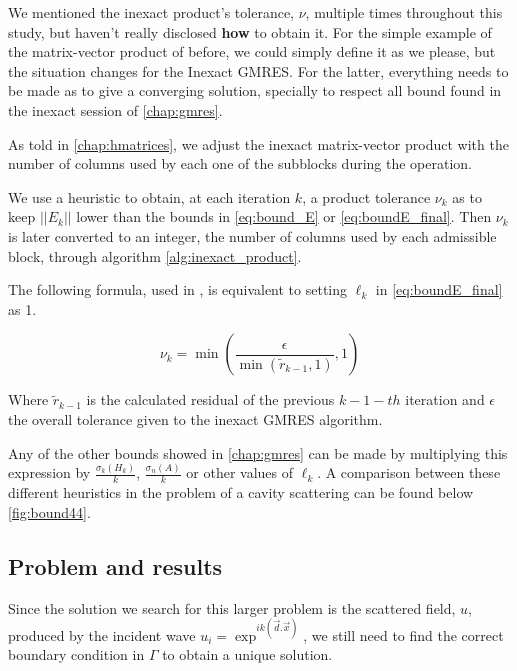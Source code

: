 We mentioned the inexact product's tolerance, $\nu$, multiple times throughout this study, but haven't really disclosed \textbf{how} to obtain it. For the simple example of the matrix-vector product of before, we could simply define it as we please, but the situation changes for the Inexact GMRES. For the latter, everything needs to be made as to give a converging solution, specially to respect all bound found in the inexact session of \autoref{chap:gmres}.

As told in \autoref{chap:hmatrices}, we adjust the inexact matrix-vector product with the number of columns used by each one of the subblocks during the operation.

We use a heuristic to obtain, at each iteration $k$, a product tolerance $\nu_{k}$ as to keep $||E_{k}||$ lower than the bounds in \autoref{eq:bound_E} or \autoref{eq:boundE_final}. Then $\nu_{k}$ is later converted to an integer, the number of columns used by each admissible block, through algorithm \ref{alg:inexact_product}.

The following formula, used in \cite{wang2016inexactkryloviterationsrelaxation}, is equivalent to setting $\ell_{k}$ in \autoref{eq:boundE_final} as 1.

\begin{equation}\label{eq:gen_heuristics}
    \nu_{k} = \min \left(\frac{\epsilon}{\min(\tilde{r}_{k-1},1)},1 \right)
\end{equation}

Where $\tilde{r}_{k-1}$ is the calculated residual of the previous $k-1-th$ iteration and $\epsilon$ the overall tolerance given to the inexact GMRES algorithm.

Any of the other bounds showed in \autoref{chap:gmres} can be made by multiplying this expression by $\frac{\sigma_{k}(H_{k})}{k}$, $\frac{\sigma_{n}(A)}{k}$ or other values of $\ell_{k}$. A comparison between these different heuristics in the problem of a cavity scattering can be found below \ref{fig:bound44}.

\subsection{Problem and results}

Since the solution we search for this larger problem is the scattered field, $u$, produced by the incident wave $u_{i} = \exp^{ik(\vec{d}.\vec{x})}$, we still need to find the correct boundary condition in $\Gamma$ to obtain a unique solution.

